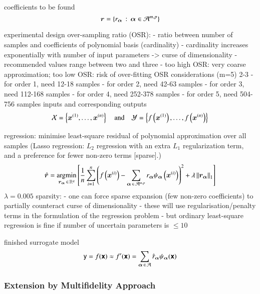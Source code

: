 coefficients to be found
\begin{equation}
    \bm r = \left\{r_{\bm{\alpha}} \,:\, {\bm{\alpha}} \in \mathcal{A}^{m,p}\right\}
\end{equation}

experimental design
over-sampling ratio (OSR):
- ratio between number of samples and coefficients of polynomial basis (cardinality) \cite{palar_multi-fidelity_2016}
- cardinality increases exponentially with number of input parameters -> curse of dimensionality
- recommended values range between two and three \cite{hosder2007,palar_multi-fidelity_2016,fajraoui_optimal_2017,gratiet_metamodel-based_2015}
- too high OSR: very coarse approximation; too low OSR: risk of over-fitting \cite{palar_multi-fidelity_2016}
OSR considerations (m=5) 2-3
- for order 1, need 12-18 samples
- for order 2, need 42-63 samples
- for order 3, need 112-168 samples
- for order 4, need 252-378 samples
- for order 5, need 504-756 samples
inputs and corresponding outputs
\begin{equation}
    \mathcal{X} = \left\{ \bm x^{(1)},\dots,\bm x^{(n)} \right\} \quad\text{and}\quad 
    \mathcal{Y} = \left\{ f\left(\bm x^{(1)}\right),\dots,f\left(\bm x^{(n)}\right) \right\}
\end{equation}

regression: minimise least-square residual of polynomial approximation over all samples (Lasso regression: $L_2$ regression with an extra $L_1$ regularization term, and a preference for fewer non-zero terms [sparse].)
\begin{equation}
    \hat{\bm{r}} = \operatorname*{\arg\!\min}_{\bm{r}_{\bm{\alpha}} \,\in\, \mathbb{R}^q} \left[ \frac{1}{n} \sum_{i=1}^n \left(
        f\left(\bm x^{(i)}\right) - \sum_{{\bm{\alpha}} \,\in\, \mathcal{A}^{m,p}} r_{\bm{\alpha}} \psi_{\bm{\alpha}}\left(\bm x^{(i)}\right)
    \right)^2  + \lambda \left\lVert\bm{r}_{\bm{\alpha}}\right\rVert_1 \right]
\end{equation}
$\lambda=0.005$
sparsity:
- one can force sparse expansion (few non-zero coefficients) to partially counteract curse of dimensionality \cite{gratiet_metamodel-based_2015}
- these will use regularisation/penalty terms in the formulation of the regression problem
- but ordinary least-square regression is fine if number of uncertain parameters is $\leq 10$ \cite{gratiet_metamodel-based_2015}

finished surrogate model
\begin{equation}
    \mathsf{y} = f(\boldsymbol{\mathsf{x}}) \approx f'(\boldsymbol{\mathsf{x}}) = \sum_{{\bm{\alpha}} \,\in\, \mathcal{A}} \hat{r}_{\bm{\alpha}} \psi_{\bm{\alpha}} (\boldsymbol{\mathsf{x}})
\end{equation}

\subsubsection{Extension by Multifidelity Approach}
\label{sec:multifidelity}

